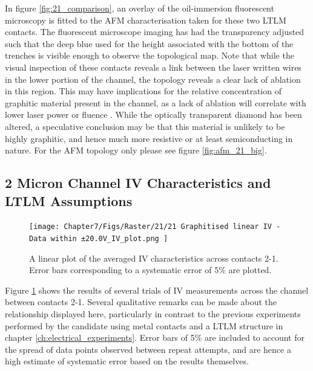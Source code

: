 \begin{refsection}
In figure \ref{fig:21_comparison}, an overlay of the oil-immersion fluorescent microscopy is fitted to the AFM characterisation taken for these two LTLM contacts. The fluorescent microscope imaging has had the transparency adjusted such that the deep blue used for the height associated with the bottom of the trenches is visible enough to observe the topological map. Note that while the visual inspection of these contacts reveals a link between the laser written wires in the lower portion of the channel, the topology reveals a clear lack of ablation in this region. This may have implications for the relative concentration of graphitic material present in the channel, as a lack of ablation will correlate with lower laser power or fluence \cite{Holly1998, kononenko2005}. While the optically transparent diamond has been altered, a speculative conclusion may be that this material is unlikely to be highly graphitic, and hence much more resistive or at least semiconducting in nature. For the AFM topology only please see figure \ref{fig:afm_21_big}.

\subsection{2 Micron Channel IV Characteristics and LTLM Assumptions}
\label{subsubsec:2um channel iv characteristics and ltlm assumptions}
\begin{figure}[H]
    \centering
    \texttt{[image: Chapter7/Figs/Raster/21/21 Graphitised linear IV - Data within ±20.0V\_IV\_plot.png ]}
    \caption{A linear plot of the averaged IV characteristics across contacts 2-1. Error bars corresponding to a systematic error of 5\% are plotted.}
    \label{fig:21_linear_iv}
\end{figure}

Figure \ref{fig:21_linear_iv} shows the results of several trials of IV measurements across the channel between contacts 2-1. Several qualitative remarks can be made about the relationship displayed here, particularly in contrast to the previous experiments performed by the candidate using metal contacts and a LTLM structure in chapter \ref{ch:electrical_experiments}. Error bars of 5\% are included to account for the spread of data points observed between repeat attempts, and are hence a high estimate of systematic error based on the results themselves.


\end{refsection}
